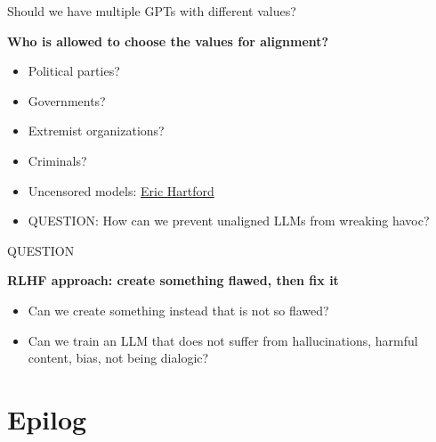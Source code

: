\begin{vbframe}{Should we have multiple GPTs with different values?}

\vfill

\textbf{Who is allowed to choose the values for alignment?}

	\begin{itemize}
		\item Political parties?
		\item Governments?
		\item Extremist organizations?
                \item Criminals?
                \item Uncensored models:
                \href{https://erichartford.com}{Eric Hartford}
                \item QUESTION: How can we prevent unaligned
		LLMs from wreaking havoc?
	\end{itemize}

\vfill

\end{vbframe}



\begin{vbframe}{QUESTION}

\vfill

\textbf{RLHF approach: create something flawed, then fix it}

	\begin{itemize}
		\item Can we create something instead that
		is not so flawed?
                \item Can we train an LLM that does not
		suffer from hallucinations, harmful content,
		bias, not being dialogic?
	\end{itemize}

\vfill

\end{vbframe}










\section{Epilog}







